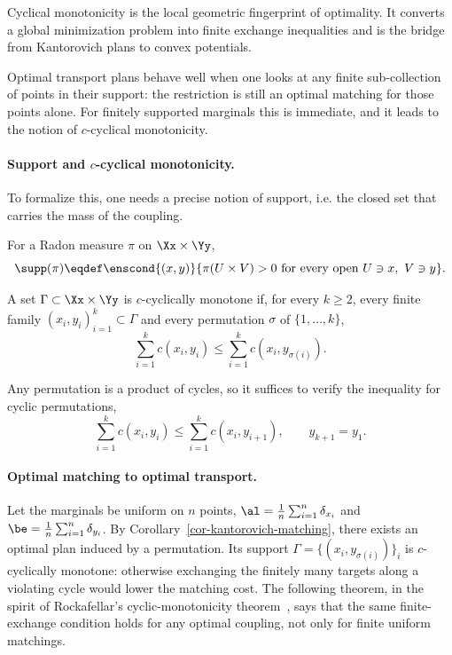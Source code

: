 Cyclical monotonicity is the local geometric fingerprint of optimality. It converts a global minimization problem into finite exchange inequalities and is the bridge from Kantorovich plans to convex potentials.

Optimal transport plans behave well when one looks at any finite sub-collection of points in their support: the restriction is still an optimal matching for those points alone. For finitely supported marginals this is immediate, and it leads to the notion of $c$-cyclical monotonicity.

\paragraph{Support and $c$-cyclical monotonicity.}

To formalize this, one needs a precise notion of support, i.e. the closed set that carries the mass of the coupling.

\begin{defn}[Support]\label{def-support}
	For a Radon measure $\pi$ on $\Xx\times\Yy$,
	\[
		\supp(\pi)
		\eqdef
		\enscond{(x,y)}{\pi(U\times V)>0\text{ for every open }U\ni x,\ V\ni y}.
	\]
\end{defn}

\begin{defn}\label{def:ccm}
	A set $\Gamma\subset\Xx\times\Yy$ is $c$-cyclically monotone if, for every $k\geq2$, every finite family $(x_i,y_i)_{i=1}^k\subset\Gamma$ and every permutation $\sigma$ of $\{1,\ldots,k\}$,
	\[
		\sum_{i=1}^k c(x_i,y_i)
		\leq
		\sum_{i=1}^k c(x_i,y_{\sigma(i)}).
	\]
\end{defn}

Any permutation is a product of cycles, so it suffices to verify the inequality for cyclic permutations,
\[
	\sum_{i=1}^k c(x_i,y_i)
	\leq
	\sum_{i=1}^k c(x_i,y_{i+1}),
	\qquad y_{k+1}=y_1.
\]

\paragraph{Optimal matching to optimal transport.}

Let the marginals be uniform on $n$ points, $\al=\frac1n\sum_{i=1}^n\delta_{x_i}$ and $\be=\frac1n\sum_{i=1}^n\delta_{y_i}$. By Corollary~\ref{cor-kantorovich-matching}, there exists an optimal plan induced by a permutation. Its support $\Gamma=\{(x_i,y_{\sigma(i)})\}_i$ is $c$-cyclically monotone: otherwise exchanging the finitely many targets along a violating cycle would lower the matching cost. The following theorem, in the spirit of Rockafellar's cyclic-monotonicity theorem~\cite{rockafellar2015convex}, says that the same finite-exchange condition holds for any optimal coupling, not only for finite uniform matchings.

